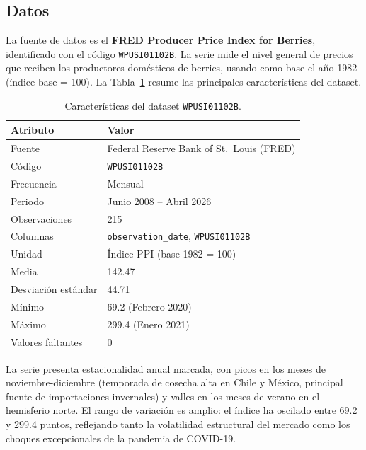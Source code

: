 \documentclass[12pt, a4paper]{article}
\begin{document}
\subsection{Datos}

La fuente de datos es el \textbf{FRED Producer Price Index for Berries}, identificado con el código
\texttt{WPUSI01102B}. La serie mide el nivel general de precios que reciben los productores
domésticos de berries, usando como base el año 1982 (índice base = 100). La Tabla~\ref{tab:datos}
resume las principales características del dataset.

\begin{table}[H]
  \centering
  \caption{Características del dataset \texttt{WPUSI01102B}.}
  \label{tab:datos}
  \begin{tabular}{ll}
    \toprule
    \textbf{Atributo}       & \textbf{Valor} \\
    \midrule
    Fuente                  & Federal Reserve Bank of St.~Louis (FRED) \\
    Código                  & \texttt{WPUSI01102B} \\
    Frecuencia              & Mensual \\
    Periodo                 & Junio 2008 – Abril 2026 \\
    Observaciones           & 215 \\
    Columnas                & \texttt{observation\_date}, \texttt{WPUSI01102B} \\
    Unidad                  & Índice PPI (base 1982 = 100) \\
    Media                   & 142.47 \\
    Desviación estándar     & 44.71 \\
    Mínimo                  & 69.2 (Febrero 2020) \\
    Máximo                  & 299.4 (Enero 2021) \\
    Valores faltantes       & 0 \\
    \bottomrule
  \end{tabular}
\end{table}

La serie presenta estacionalidad anual marcada, con picos en los meses de noviembre-diciembre
(temporada de cosecha alta en Chile y México, principal fuente de importaciones invernales) y
valles en los meses de verano en el hemisferio norte. El rango de variación es amplio: el índice
ha oscilado entre 69.2 y 299.4 puntos, reflejando tanto la volatilidad estructural del mercado
como los choques excepcionales de la pandemia de COVID-19.
\end{document}
